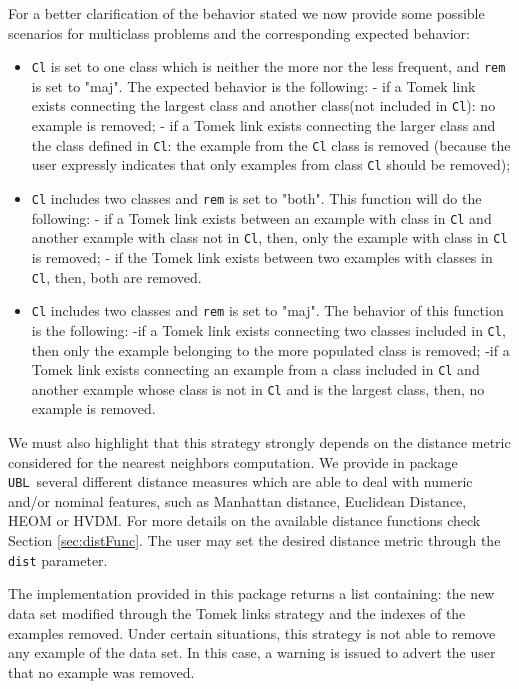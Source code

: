 \documentclass[10pt,a4paper]{article}\usepackage[]{graphicx}\usepackage[]{color}
\newcommand{\UBL}{package \texttt{UBL}\ }
\begin{document}
For a better clarification of the behavior stated we now provide some possible scenarios for multiclass problems and the corresponding expected behavior:

\begin{itemize}
\item \texttt{Cl} is set to one class which is neither the more nor the less frequent, and \texttt{rem} is set to "maj". The expected behavior is the following:
- if a Tomek link exists connecting the largest class and another class(not included in \texttt{Cl}): no example is removed;
- if a Tomek link exists connecting the larger class and the class defined in \texttt{Cl}: the example from the \texttt{Cl} class is removed (because the user expressly indicates that only examples from class \texttt{Cl} should be removed);

\item \texttt{Cl} includes two classes and \texttt{rem} is set to "both". This function will do the following:
- if a Tomek link exists between an example with class in \texttt{Cl} and another example with class not in \texttt{Cl}, then, only the example with class in \texttt{Cl} is removed;
- if the Tomek link exists between two examples with classes in \texttt{Cl}, then, both are removed.

\item \texttt{Cl} includes two classes and \texttt{rem} is set to "maj". The behavior of this function is the following:
-if a Tomek link exists connecting two classes included in \texttt{Cl}, then only the example belonging to the more populated class is removed;
-if a Tomek link exists connecting an example from a class included in \texttt{Cl} and another example whose class is not in \texttt{Cl} and is the largest class, then, no example is removed.

\end{itemize}


We must also highlight that this strategy strongly depends on the distance metric considered for the nearest neighbors computation. We provide in \UBL several different distance measures which are able to deal with numeric and/or nominal features, such as Manhattan distance, Euclidean Distance, HEOM or HVDM. For more details on the available distance functions check Section \ref{sec:distFunc}. The user may set the desired distance metric through the \texttt{dist} parameter.


The implementation provided in this package returns a list containing: the new data set modified through the Tomek links strategy and the indexes of the examples removed. Under certain situations, this strategy is not able to remove any example of the data set. In this case, a warning is issued to advert the user that no example was removed.
\end{document}
